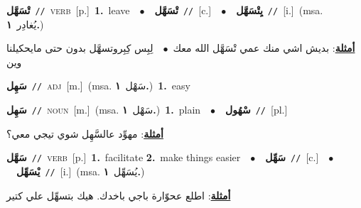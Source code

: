 \documentclass[10pt,a4paper,twoside]{article} %
\begin{document}
\begin{multicols}{2}
{\setlength\topsep{0pt}\textbf{\foreignlanguage{arabic}{تْسَهَّل}}\ {\color{gray}\texttt{//}\color{black}}\ \textsc{verb}\ [p.]\ \textbf{1.}~leave\ \ $\bullet$\ \ \setlength\topsep{0pt}\textbf{\foreignlanguage{arabic}{تْسَهَّل}}\ {\color{gray}\texttt{//}\color{black}}\ [c.]\ \ $\bullet$\ \ \setlength\topsep{0pt}\textbf{\foreignlanguage{arabic}{يِتْسَهَّل}}\ {\color{gray}\texttt{//}\color{black}}\ [i.]\ \color{gray}(msa. \foreignlanguage{arabic}{يُغادِر}~\foreignlanguage{arabic}{\textbf{١.}})\color{black}\  \begin{flushright}\color{gray}\foreignlanguage{arabic}{\textbf{\underline{\foreignlanguage{arabic}{أمثلة}}}: بديش اشي منك عمي تْسَهَّل الله معك\ $\bullet$\ \  لِبِس كِبِروتسهَّل بدون حتى مايحكيلنا وين}\end{flushright}\color{black}} \vspace{2mm}

{\setlength\topsep{0pt}\textbf{\foreignlanguage{arabic}{سَهِل}}\ {\color{gray}\texttt{//}\color{black}}\ \textsc{adj}\ [m.]\ \color{gray}(msa. \foreignlanguage{arabic}{سَهْل}~\foreignlanguage{arabic}{\textbf{١.}})\color{black}\ \textbf{1.}~easy\ } \vspace{2mm}

{\setlength\topsep{0pt}\textbf{\foreignlanguage{arabic}{سَهِل}}\ {\color{gray}\texttt{//}\color{black}}\ \textsc{noun}\ [m.]\ \color{gray}(msa. \foreignlanguage{arabic}{سَهْل}~\foreignlanguage{arabic}{\textbf{١.}})\color{black}\ \textbf{1.}~plain\ \ $\bullet$\ \ \setlength\topsep{0pt}\textbf{\foreignlanguage{arabic}{سْهُول}}\ {\color{gray}\texttt{//}\color{black}}\ [pl.]\  \begin{flushright}\color{gray}\foreignlanguage{arabic}{\textbf{\underline{\foreignlanguage{arabic}{أمثلة}}}: مهوِّد عالسَّهِل شوي تيجي معي؟}\end{flushright}\color{black}} \vspace{2mm}

{\setlength\topsep{0pt}\textbf{\foreignlanguage{arabic}{سَهَّل}}\ {\color{gray}\texttt{//}\color{black}}\ \textsc{verb}\ [p.]\ \textbf{1.}~facilitate  \textbf{2.}~make things easier\ \ $\bullet$\ \ \setlength\topsep{0pt}\textbf{\foreignlanguage{arabic}{سَهِّل}}\ {\color{gray}\texttt{//}\color{black}}\ [c.]\ \ $\bullet$\ \ \setlength\topsep{0pt}\textbf{\foreignlanguage{arabic}{يْسَهِّل}}\ {\color{gray}\texttt{//}\color{black}}\ [i.]\ \color{gray}(msa. \foreignlanguage{arabic}{يُسَهِّل}~\foreignlanguage{arabic}{\textbf{١.}})\color{black}\  \begin{flushright}\color{gray}\foreignlanguage{arabic}{\textbf{\underline{\foreignlanguage{arabic}{أمثلة}}}: اطلع عحوّارة باجي باخدك. هيك بتسهِّل علي كتير}\end{flushright}\color{black}} \vspace{2mm}


\end{multicols}
\end{document}
